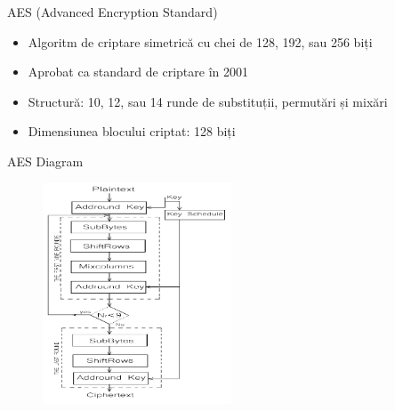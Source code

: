 \documentclass{beamer}
\begin{document}
\begin{frame}{AES (Advanced Encryption Standard)}
  \begin{itemize}
    \item Algoritm de criptare simetrică cu chei de 128, 192, sau 256 biți
    \item Aprobat ca standard de criptare în 2001
    \item Structură: 10, 12, sau 14 runde de substituții, permutări și mixări
    \item Dimensiunea blocului criptat: 128 biți
  \end{itemize}
\end{frame}

\begin{frame}{AES Diagram}
  \begin{figure}
    \centering
    \includegraphics[width=0.5\textwidth]{images/aes_diagram.png}
  \end{figure}
\end{frame}
\end{document}
